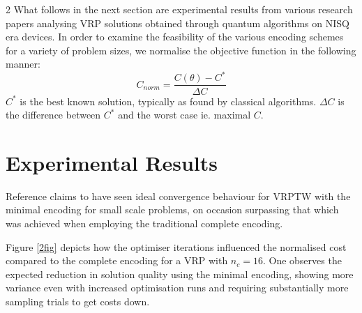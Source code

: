 \documentclass [10pt]{article}
\begin{document}
\begin {multicols}{2}
What follows in the next section are experimental results from various
research papers analysing VRP solutions obtained through quantum algorithms on
NISQ era devices.
In order to examine the feasibility of the various encoding schemes for a
variety of problem sizes, we normalise the objective function in the following
manner:
\begin {equation}
C_{norm} = \frac{C(\theta) - C^*}{\Delta C}
\end {equation}
$C^*$ is the best known solution, typically as found by classical algorithms.
$\Delta C$ is the difference between $C^*$ and the worst case ie. maximal $C$.

\section {Experimental Results}
Reference \cite{effvrp} claims to have seen ideal convergence behaviour for
VRPTW with the minimal encoding for small scale problems, on occasion
surpassing that which was achieved when employing the traditional complete
encoding.

Figure \ref{2fig} depicts
how the optimiser iterations influenced the normalised cost compared to the
complete encoding for a VRP with $n_c = 16$. One observes the
expected reduction in solution quality using the minimal encoding, showing
more variance even with increased optimisation runs and requiring substantially
more sampling trials to get costs down.


\end{multicols}
\end{document}
